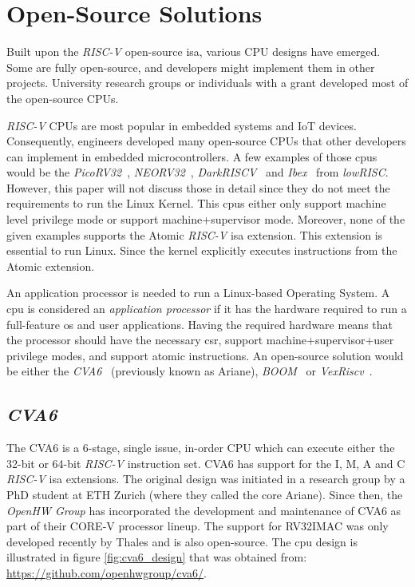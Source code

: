 \section{Open-Source Solutions}
\label{section:open_source_solutions}
Built upon the \textit{RISC-V} open-source \acrlong{isa}, various CPU designs have emerged. Some are fully open-source, and developers might implement them in other projects. University research groups or individuals with a grant developed most of the open-source CPUs.

\textit{RISC-V} CPUs are most popular in embedded systems and IoT devices. Consequently, engineers developed many open-source CPUs that other developers can implement in embedded microcontrollers. A few examples of those \acrshort{cpu}s would be the \textit{PicoRV32}~\cite{picorv32}, \textit{NEORV32}~\cite{neorv32}, \textit{DarkRISCV}~\cite{darkriscv} and \textit{Ibex}~\cite{ibex} from \textit{lowRISC}. However, this paper will not discuss those in detail since they do not meet the requirements to run the Linux Kernel. This \acrshort{cpu}s either only support \acrfull{machine} level privilege mode or support \acrfull{machine}+\acrfull{supervisor} mode. Moreover, none of the given examples supports the Atomic \textit{RISC-V} \acrshort{isa} extension. This extension is essential to run Linux. Since the kernel explicitly executes instructions from the Atomic extension.

An application processor is needed to run a Linux-based Operating System. A \acrshort{cpu} is considered an \textit{application processor} if it has the hardware required to run a full-feature \acrfull{os} and user applications. Having the required hardware means that the processor should have the necessary \acrfull{csr}, support \acrshort{machine}+\acrshort{supervisor}+\acrshort{user} privilege modes, and support atomic instructions. An open-source solution would be either the \textit{CVA6}~\cite{zaruba2019cost} (previously known as Ariane), \textit{BOOM}~\cite{zhaosonicboom} or \textit{VexRiscv}~\cite{vexriscv}.

\subsection{\textit{CVA6}}
The CVA6 is a 6-stage, single issue, in-order CPU which can execute either the 32-bit or 64-bit \textit{RISC-V} instruction set. CVA6 has support for the I, M, A and C \textit{RISC-V} \acrshort{isa} extensions. The original design was initiated in a research group by a PhD student at ETH Zurich (where they called the core Ariane). Since then, the \textit{OpenHW Group} has incorporated the development and maintenance of CVA6 as part of their CORE-V processor lineup. The support for RV32IMAC was only developed recently by Thales and is also open-source. The \acrshort{cpu} design is illustrated in figure \ref{fig:cva6_design} that was obtained from: \url{https://github.com/openhwgroup/cva6/}.

